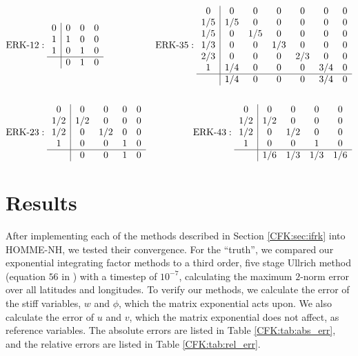 \documentclass{csri19}
\begin{document}
\begin{align*}&\text{ERK-}12:
 \begin{array}{c|ccc}
0   & 0 & 0 & 0\\
1   & 1 & 0 & 0\\
1   & 0 & 1 & 0\\
\hline
    & 0   & 1 & 0
\end{array}
& \text{ERK-}35: 
\begin{array}{c|cccccc}
0   & 0   & 0   & 0   & 0   & 0   & 0\\
1/5 & 1/5 & 0   & 0   & 0   & 0   & 0\\
1/5 & 0   & 1/5 & 0   & 0   & 0   & 0\\
1/3 & 0   & 0   & 1/3 & 0   & 0   & 0\\
2/3 & 0   & 0   & 0   & 2/3 & 0   & 0\\
1   & 1/4 & 0   & 0   & 0   & 3/4 & 0\\
\hline
    & 1/4 & 0   & 0   & 0   & 3/4 & 0
\end{array}\\
\\
&\text{ERK-}23: 
\begin{array}{c|cccc}
0   & 0   & 0   & 0 & 0\\
1/2 & 1/2 & 0   & 0 & 0\\
1/2 & 0   & 1/2 & 0 & 0\\
1   & 0   & 0   & 1 & 0\\
\hline
    & 0   & 0   & 1 & 0
\end{array}
& \text{ERK-}43: 
\begin{array}{c|cccc}
0   & 0   & 0   & 0   & 0 \\
1/2 & 1/2 & 0   & 0   & 0 \\
1/2 & 0   & 1/2 & 0   & 0 \\
1   & 0   & 0   & 1   & 0 \\
\hline
    & 1/6 & 1/3 & 1/3 & 1/6
\end{array} 
\end{align*}

\section{Results}\label{CFK:sec:results}
After implementing each of the methods described in Section 
\ref{CFK:sec:ifrk} into HOMME-NH, we tested their convergence. For the 
``truth'', we compared our exponential integrating factor methods to a 
third order, five stage Ullrich method (equation $56$ in 
\cite{CFK:Guerra2016}) with a timestep of $10^{-7}$, calculating the 
maximum $2$-norm error over all latitudes and longitudes. To verify our 
methods, we calculate the error of the stiff variables, $w$ and $\phi$, 
which the matrix exponential acts upon. We also calculate the error of $u$ 
and $v$, which the matrix exponential does not affect, as reference 
variables. The absolute errors are listed in Table \ref{CFK:tab:abs_err}, 
and the relative errors are listed in Table \ref{CFK:tab:rel_err}.
\end{document}
